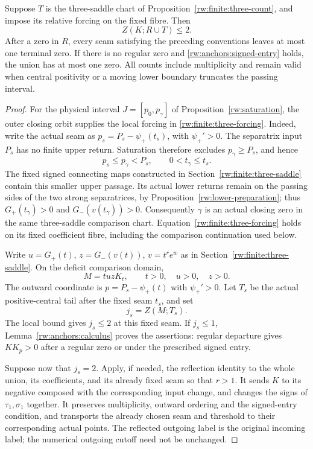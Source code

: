 \begin{proposition}
\label{rw:anchors:three-saddle}
Suppose $T$ is the three-saddle chart of
Proposition~\ref{rw:finite:three-count}, and impose its relative
forcing on the fixed fibre. Then
\[
 Z(K;R\cup T)\le2.
\]
After a zero in $R$, every seam satisfying the preceding conventions
leaves at most one terminal zero. If there is no regular zero and
\eqref{rw:anchors:signed-entry} holds, the union has at most one zero.
All counts include multiplicity and remain valid when central positivity
or a moving lower boundary truncates the passing interval.
\end{proposition}
\begin{proof}
For the physical interval $J=[p_0,p_\gamma]$ of
Proposition~\ref{rw:saturation}, the outer closing orbit supplies the
local forcing in \eqref{rw:finite:three-forcing}.
Indeed, write the actual seam as $p_s=P_s-\psi_+(t_s)$,
with $\psi_+'>0$. The separatrix input $P_s$ has no finite upper
return. Saturation therefore excludes $p_\gamma\ge P_s$, and hence
\[
 p_s\le p_\gamma<P_s,\qquad 0<t_\gamma\le t_s.
\]
The fixed signed connecting maps constructed in
Section~\ref{rw:finite:three-saddle} contain this smaller upper
passage. Its actual lower returns remain on the passing sides
of the two strong separatrices, by
Proposition~\ref{rw:lower-preparation}; thus
$G_+(t_\gamma)>0$ and $G_-(v(t_\gamma))>0$.
Consequently $\gamma$ is an actual closing zero in the same
three-saddle comparison chart. Equation~\eqref{rw:finite:three-forcing}
holds on its fixed coefficient fibre, including the comparison
continuation used below.

Write $u=G_+(t)$, $z=G_-(v(t))$, $v=t^re^w$ as in
Section~\ref{rw:finite:three-saddle}. On the deficit comparison domain,
\[
 M=tuz K_t,\qquad t>0,\quad u>0,\quad z>0.
\]
The outward coordinate is $p=P_s-\psi_+(t)$ with
$\psi_+'>0$. Let $T_s$ be the actual positive-central tail after
the fixed seam $t_s$, and set
\begin{equation}\label{rw:anchors:fixed-seam-number}
 j_s=Z(M;T_s).
\end{equation}
The local bound gives $j_s\le2$ at this fixed seam.
If $j_s\le1$, Lemma~\ref{rw:anchors:calculus} proves the assertions:
regular departure gives $KK_p>0$ after a regular zero or under the
prescribed signed entry.

Suppose now that $j_s=2$. Apply, if needed, the reflection identity to
the whole union, its coefficients, and its already fixed seam so that
$r>1$. It sends $K$ to its negative composed with the corresponding
input change, and changes the signs of $\tau_1,\sigma_1$ together.
It preserves multiplicity, outward ordering and the signed-entry
condition, and transports the already chosen seam and threshold to
their corresponding actual points. The reflected outgoing label is
the original incoming label; the numerical outgoing cutoff need not
be unchanged.


\end{proof}
